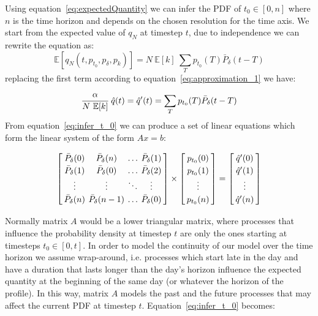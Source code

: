 \documentclass[conference]{IEEEtran}
\begin{document}
Using equation~\eqref{eq:expectedQuantity} we can infer the PDF of $t_0 \in [0, n]$ where $n$ is the time horizon and depends on the chosen resolution for the time axis. We start from the expected value of $q_N$ at timestep $t$, due to independence we can rewrite the equation as:
\begin{equation}
\mathbb{E}\left[ q_N(t, p_{t_0}, p_{\delta}, p_k) \right] = N~\mathbb{E}[k]~\sum_{T} p_{t_0}(T) \bar{P}_{\delta} (t-T)
\end{equation}
replacing the first term according to equation~\eqref{eq:approximation_1} we have:
\begin{equation}
\cfrac{\alpha}{N~\mathbb{E}[k]}~\hat{q}(t) = \hat{q}'(t) = \sum_{T} p_{t_0}(T) \bar{P}_{\delta} (t-T) \label{eq:infer_t_0}
\end{equation}
From equation~\eqref{eq:infer_t_0} we can produce a set of linear equations which form the linear system of the form $Ax = b$:
\begin{small}
\begin{equation}\label{eq:linearSystem}
\arraycolsep=2pt\def\arraystretch{1.2}
\left[\begin{array}{cccc}  
 \bar{P}_{\delta}(0)  & \bar{P}_{\delta}(n) & \ldots  & \bar{P}_{\delta}(1)\\
 \bar{P}_{\delta}(1)  & \bar{P}_{\delta}(0) & \ldots  & \bar{P}_{\delta}(2)\\
\vdots  & \vdots & \ddots  & \vdots\\
 \bar{P}_{\delta}(n)  & \bar{P}_{\delta}(n-1) & \ldots  & \bar{P}_{\delta}(0)
\end{array}\right]
\times
\left[\begin{array}{c}  
 p_{t_0}(0) \\ 
  p_{t_0}(1) \\
 \vdots \\
 p_{t_0}(n) \\  
\end{array}\right]
=
\left[\begin{array}{c}  
 \hat{q}'(0) \\ 
  \hat{q}'(1) \\ 
 \vdots \\
 \hat{q}'(n) \\  
\end{array}\right]
\end{equation}
\end{small}Normally matrix $A$ would be a lower triangular matrix, where processes that influence the probability density at timestep $t$ are only the ones starting at timesteps $t_0 \in [0, t]$. In order to model the continuity of our model over the time horizon we assume wrap-around, i.e. processes which start late in the day and have a duration that lasts longer than the day's horizon influence the expected quantity at the beginning of the same day (or whatever the horizon of the profile). In this way, matrix $A$ models the past and the future processes that may affect the current PDF at timestep $t$. Equation~\eqref{eq:infer_t_0} becomes:
\end{document}
